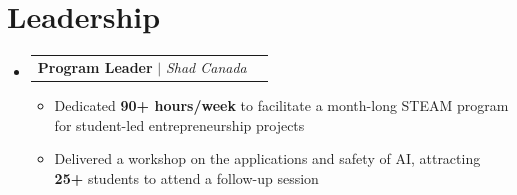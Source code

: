 \documentclass[letterpaper,11pt]{article}
\makeatletter
\newcommand{\resumeItem}[1]{
  \item\small{
    {#1 \vspace{-0.6pt}}
  }
}
\newcommand{\resumeSubheadingB}[3]{
  \vspace{0pt}\item
    \begin{tabular*}{0.97\textwidth}[t]{l@{\extracolsep{\fill}}r}
      \textbf{#1} $|$ \textit{#3} & #2 \\
    \end{tabular*}\vspace{-7pt}
}
\newcommand{\resumeSubHeadingListStart}{\begin{itemize}[leftmargin=0.15in, label={}]}
\newcommand{\resumeSubHeadingListEnd}{\end{itemize}}
\newcommand{\resumeItemListStart}{\begin{itemize}}
\newcommand{\resumeItemListEnd}{\end{itemize}\vspace{-7pt}}
\makeatother
\begin{document}
\section{Leadership}
    \resumeSubHeadingListStart
        \resumeSubheadingB{Program Leader}{}{Shad Canada}
            \resumeItemListStart
                \resumeItem{Dedicated \textbf{90+ hours/week} to facilitate a month-long STEAM program for student-led entrepreneurship projects}
                \resumeItem{Delivered a workshop on the applications and safety of AI, attracting \textbf{25+} students to attend a follow-up session}
            \resumeItemListEnd
    \resumeSubHeadingListEnd
    \vspace{-6pt}
    
\end{document}
